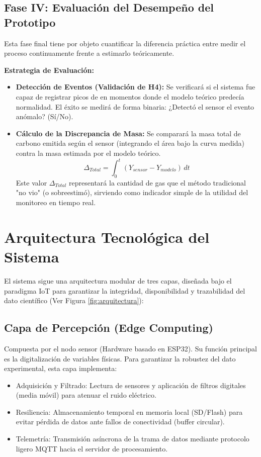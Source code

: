\subsection{Fase IV: Evaluación del Desempeño del Prototipo}

Esta fase final tiene por objeto cuantificar la diferencia práctica entre medir el proceso continuamente frente a estimarlo teóricamente.

\textbf{Estrategia de Evaluación:} \begin{itemize} \item \textbf{Detección de Eventos (Validación de H4):} Se verificará si el sistema fue capaz de registrar picos de  en momentos donde el modelo teórico predecía normalidad. El éxito se medirá de forma binaria: ¿Detectó el sensor el evento anómalo? (Sí/No).

\item \textbf{Cálculo de la Discrepancia de Masa:} Se comparará la masa total de carbono emitida según el sensor (integrando el área bajo la curva medida) contra la masa estimada por el modelo teórico.
\begin{equation}
    \Delta_{Total} = \int_{0}^{t} (Y_{sensor} - Y_{modelo}) \, dt
\end{equation}
Este valor $\Delta_{Total}$ representará la cantidad de gas que el método tradicional "no vio" (o sobreestimó), sirviendo como indicador simple de la utilidad del monitoreo en tiempo real.
\end{itemize}

\section{Arquitectura Tecnológica del Sistema}

El sistema sigue una arquitectura modular de tres capas, diseñada bajo el paradigma IoT para garantizar la integridad, disponibilidad y trazabilidad del dato científico (Ver Figura \ref{fig:arquitectura}):

\subsection{Capa de Percepción (Edge Computing)} Compuesta por el nodo sensor (Hardware basado en ESP32). Su función principal es la digitalización de variables físicas. Para garantizar la robustez del dato experimental, esta capa implementa: \begin{itemize} \item Adquisición y Filtrado: Lectura de sensores y aplicación de filtros digitales (media móvil) para atenuar el ruido eléctrico. \item Resiliencia: Almacenamiento temporal en memoria local (SD/Flash) para evitar pérdida de datos ante fallos de conectividad (buffer circular). \item Telemetría: Transmisión asíncrona de la trama de datos mediante protocolo ligero MQTT hacia el servidor de procesamiento. \end{itemize}

